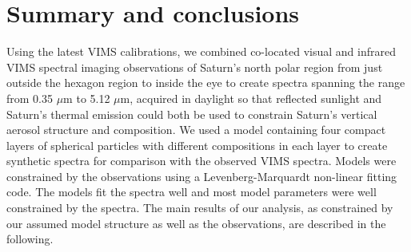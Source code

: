 \documentclass[article,11pt]{emulateapj}
\def\mum{$\mu$m }
\def\mumx{$\mu$m}
\begin{document}
\section{Summary and conclusions}

Using the latest VIMS calibrations, we combined co-located visual and infrared VIMS spectral
imaging observations of Saturn's north polar region from just outside the hexagon region to
inside the eye to create spectra spanning the range from 0.35 \mum to 5.12 \mumx, acquired in
daylight so that reflected sunlight and Saturn's thermal emission could both be used
to constrain Saturn's vertical aerosol structure and composition.  We used
a model containing four compact layers of spherical particles with different compositions in each layer to create
synthetic spectra for comparison with the observed VIMS
spectra. Models were constrained by the observations using a Levenberg-Marquardt non-linear
fitting code. The models fit the spectra well and most model parameters were
well constrained by the spectra.  The main results of our analysis, as constrained by
our assumed model structure as well as the observations, are described in the following.
\end{document}
